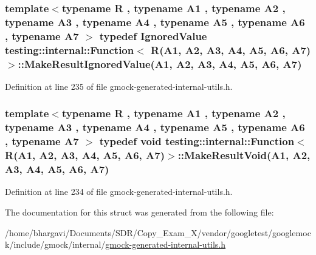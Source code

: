 \subsubsection[{\texorpdfstring{Make\+Result\+Ignored\+Value}{MakeResultIgnoredValue}}]{\setlength{\rightskip}{0pt plus 5cm}template$<$typename R , typename A1 , typename A2 , typename A3 , typename A4 , typename A5 , typename A6 , typename A7 $>$ typedef {\bf Ignored\+Value} {\bf testing\+::internal\+::\+Function}$<$ {\bf R}(A1, A2, A3, A4, A5, A6, A7)$>$\+::Make\+Result\+Ignored\+Value(A1, A2, A3, A4, A5, A6, A7)}\hypertarget{structtesting_1_1internal_1_1_function_3_01_r_07_a1_00_01_a2_00_01_a3_00_01_a4_00_01_a5_00_01_a6_00_01_a7_08_4_a12b0ade73c76ea564afa7dd2b5c219b6}{}\label{structtesting_1_1internal_1_1_function_3_01_r_07_a1_00_01_a2_00_01_a3_00_01_a4_00_01_a5_00_01_a6_00_01_a7_08_4_a12b0ade73c76ea564afa7dd2b5c219b6}


Definition at line 235 of file gmock-\/generated-\/internal-\/utils.\+h.

\subsubsection[{\texorpdfstring{Make\+Result\+Void}{MakeResultVoid}}]{\setlength{\rightskip}{0pt plus 5cm}template$<$typename R , typename A1 , typename A2 , typename A3 , typename A4 , typename A5 , typename A6 , typename A7 $>$ typedef void {\bf testing\+::internal\+::\+Function}$<$ {\bf R}(A1, A2, A3, A4, A5, A6, A7)$>$\+::Make\+Result\+Void(A1, A2, A3, A4, A5, A6, A7)}\hypertarget{structtesting_1_1internal_1_1_function_3_01_r_07_a1_00_01_a2_00_01_a3_00_01_a4_00_01_a5_00_01_a6_00_01_a7_08_4_a9e3d04c8472e00161b080690f62f9eb4}{}\label{structtesting_1_1internal_1_1_function_3_01_r_07_a1_00_01_a2_00_01_a3_00_01_a4_00_01_a5_00_01_a6_00_01_a7_08_4_a9e3d04c8472e00161b080690f62f9eb4}


Definition at line 234 of file gmock-\/generated-\/internal-\/utils.\+h.



The documentation for this struct was generated from the following file\+:\begin{DoxyCompactItemize}
\item 
/home/bhargavi/\+Documents/\+S\+D\+R/\+Copy\+\_\+\+Exam\+\_\+X/vendor/googletest/googlemock/include/gmock/internal/\hyperlink{gmock-generated-internal-utils_8h}{gmock-\/generated-\/internal-\/utils.\+h}\end{DoxyCompactItemize}
